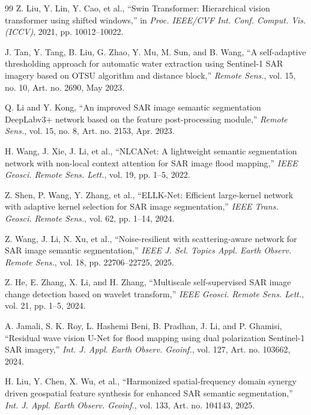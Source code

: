 \documentclass[lettersize,journal]{IEEEtran}
\begin{document}
\begin{thebibliography}{99}
Z. Liu, Y. Lin, Y. Cao, et al., ``Swin Transformer: Hierarchical vision transformer using shifted windows,'' in \textit{Proc. IEEE/CVF Int. Conf. Comput. Vis. (ICCV)}, 2021, pp. 10012--10022.

J. Tan, Y. Tang, B. Liu, G. Zhao, Y. Mu, M. Sun, and B. Wang, ``A self-adaptive thresholding approach for automatic water extraction using Sentinel-1 SAR imagery based on OTSU algorithm and distance block,'' \textit{Remote Sens.}, vol. 15, no. 10, Art. no. 2690, May 2023.

Q. Li and Y. Kong, ``An improved SAR image semantic segmentation DeepLabv3+ network based on the feature post-processing module,'' \textit{Remote Sens.}, vol. 15, no. 8, Art. no. 2153, Apr. 2023.

H. Wang, J. Xie, J. Li, et al., ``NLCANet: A lightweight semantic segmentation network with non-local context attention for SAR image flood mapping,'' \textit{IEEE Geosci. Remote Sens. Lett.}, vol. 19, pp. 1--5, 2022.

Z. Shen, P. Wang, Y. Zhang, et al., ``ELLK-Net: Efficient large-kernel network with adaptive kernel selection for SAR image segmentation,'' \textit{IEEE Trans. Geosci. Remote Sens.}, vol. 62, pp. 1--14, 2024.

Z. Wang, J. Li, N. Xu, et al., ``Noise-resilient with scattering-aware network for SAR image semantic segmentation,'' \textit{IEEE J. Sel. Topics Appl. Earth Observ. Remote Sens.}, vol. 18, pp. 22706--22725, 2025.

Z. He, E. Zhang, X. Li, and H. Zhang, ``Multiscale self-supervised SAR image change detection based on wavelet transform,'' \textit{IEEE Geosci. Remote Sens. Lett.}, vol. 21, pp. 1--5, 2024.

A. Jamali, S. K. Roy, L. Hashemi Beni, B. Pradhan, J. Li, and P. Ghamisi, ``Residual wave vision U-Net for flood mapping using dual polarization Sentinel-1 SAR imagery,'' \textit{Int. J. Appl. Earth Observ. Geoinf.}, vol. 127, Art. no. 103662, 2024.

H. Liu, Y. Chen, X. Wu, et al., ``Harmonized spatial-frequency domain synergy driven geospatial feature synthesis for enhanced SAR semantic segmentation,'' \textit{Int. J. Appl. Earth Observ. Geoinf.}, vol. 133, Art. no. 104143, 2025.


\end{thebibliography}
\end{document}
